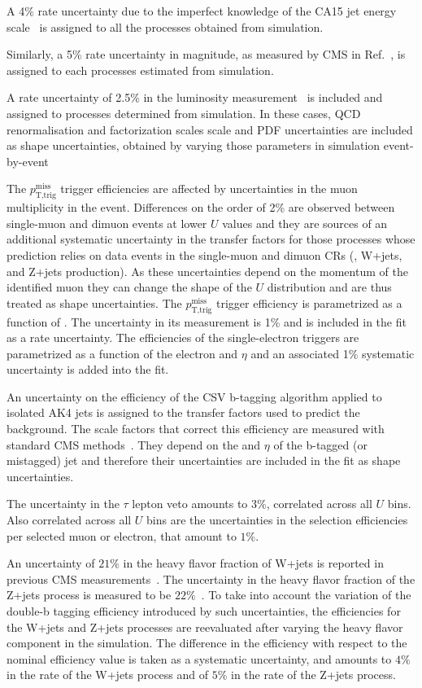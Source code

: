 A 4\% rate uncertainty due to the imperfect knowledge of the CA15 jet energy scale~\cite{jec} is assigned to all the processes obtained from simulation.

Similarly, a 5\% rate uncertainty in \ptmiss magnitude, as measured by CMS in Ref.~\cite{Khachatryan:2014gga}, is assigned to each processes estimated from simulation.

A rate uncertainty of 2.5\% in the luminosity measurement~\cite{CMS-PAS-LUM-17-001} is included and assigned to processes determined from simulation. In these cases, QCD renormalisation and factorization scales scale and PDF uncertainties are included as shape uncertainties, obtained by varying those parameters in simulation event-by-event

The $p_\text{T,trig}^\text{miss}$ trigger efficiencies are affected by uncertainties in the muon multiplicity in the event.  Differences on the order of 2\% are observed between single-muon and dimuon events at lower $U$ values and they are sources of an additional systematic uncertainty in the transfer factors for those processes whose prediction relies on data events in the single-muon and
dimuon CRs (\ttbar, W+jets, and Z+jets production). As these uncertainties depend on the momentum of the identified muon they can change the shape of the $U$ distribution and are thus treated as shape uncertainties. The $p_\text{T,trig}^\text{miss}$ trigger efficiency is parametrized as a function of \ptmiss. The uncertainty in its measurement is 1\% and is included in the fit as a rate uncertainty.
The efficiencies of the single-electron triggers are parametrized as a function of the electron \pt and $\eta$ and an associated 1\% systematic uncertainty is added into the fit.

An uncertainty on the efficiency of the CSV b-tagging algorithm applied to isolated AK4 jets is assigned to the transfer factors used to predict the \ttbar background. The scale factors that correct this efficiency are measured with standard CMS methods~\cite{Sirunyan:2017ezt}. They depend on the \pt and $\eta$ of the b-tagged (or mistagged) jet and therefore their uncertainties are included in the fit as shape uncertainties.

The uncertainty in the $\tau$ lepton veto amounts to $3\%$, correlated across all $U$ bins. Also correlated across all $U$ bins are the uncertainties in the selection efficiencies per selected muon or electron, that amount to $1\%$.

An uncertainty of $21\%$ in the heavy flavor fraction of W+jets is reported in previous CMS measurements~\cite{Khachatryan:2014uva,Chatrchyan:2013uza}. The uncertainty in the heavy flavor fraction of the Z+jets process is measured to be $22\%$~\cite{Khachatryan:2014zya,Chatrchyan:2014dha}. To take into account the variation of the double-b tagging efficiency introduced by such uncertainties, the efficiencies for the W+jets and Z+jets processes are reevaluated after varying the heavy flavor component in the simulation. The difference in the efficiency with respect to the nominal efficiency value is taken as a systematic uncertainty, and amounts to $4\%$ in the rate of the W+jets process and of $5\%$ in the rate of the Z+jets process. 

